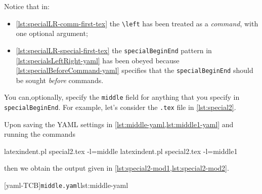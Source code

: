 	\begin{minipage}{.49\linewidth}
	\end{minipage}
	\hfill
	\begin{minipage}{.49\linewidth}
	\end{minipage}

	Notice that in:
	\begin{itemize}
		\item \cref{lst:specialLR-comm-first-tex} the \lstinline!\left! has been treated as a
		      \emph{command}, with one optional argument;
		\item \cref{lst:specialLR-special-first-tex} the \texttt{specialBeginEnd} pattern in \cref{lst:specialsLeftRight-yaml}
		      has been obeyed because \cref{lst:specialBeforeCommand-yaml} specifies that the
		      \texttt{specialBeginEnd} should be sought \emph{before} commands.
	\end{itemize}

	You can,optionally, specify%
	 the
	\texttt{middle} field for anything that you specify in \texttt{specialBeginEnd}.
	For example, let's consider the \texttt{.tex} file in \cref{lst:special2}.


	Upon saving the YAML settings in \cref{lst:middle-yaml,lst:middle1-yaml} and running the commands
	\begin{commandshell}
latexindent.pl special2.tex -l=middle
latexindent.pl special2.tex -l=middle1
\end{commandshell}
	then we obtain the output given in \cref{lst:special2-mod1,lst:special2-mod2}.

	\begin{cmhtcbraster}
		[yaml-TCB]{\texttt{middle.yaml}}{lst:middle-yaml}
	\end{cmhtcbraster}

